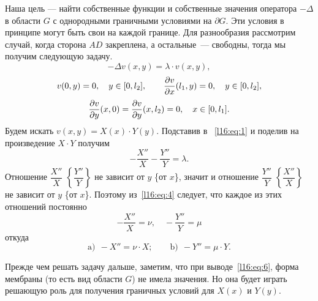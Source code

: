 \noindent Наша цель --- найти собственные функции и собственные значения оператора $-\Delta$ в области $G$ с однородными граничными условиями на $\partial G$. Эти условия в принципе могут быть свои на каждой границе. Для разнообразия рассмотрим случай, когда сторона $AD$ закреплена, а остальные~--- свободны, тогда мы получим следующую задачу.
\begin{equation}\label{l16:eq:1}
	-\Delta v(x,y)=\lambda\cdot v(x,y),
\end{equation}  
\begin{equation}\label{l16:eq:2}
	 v(0,y)=0,\quad y\in[0,l_2],\qquad \frac{\partial v}{\partial x}(l_1,y)=0,\quad y\in[0,l_2],
\end{equation}
\begin{equation}\label{l16:eq:3}
	 \frac{\partial v}{\partial y}(x,0)=\frac{\partial v}{\partial y}(x,l_2)=0,\quad  x\in[0,l_1].
\end{equation}
Будем искать $v(x,y)=X(x)\cdot Y(y)$. Подставив в ~\eqref{l16:eq:1} и поделив на произведение $X\cdot Y$ получим 
\begin{equation}\label{l16:eq:4}
	-\frac{X''}{X}-\frac{Y''}{Y}=\lambda.
\end{equation}
Отношение $\dfrac{X''}{X}$ $\left\{\dfrac{Y''}{Y}\right\}$ не зависит от $y$ \{от $x$\}, значит и отношение $\dfrac{Y''}{Y}$ $\left\{\dfrac{X''}{X}\right\}$ не зависит от $y$ \{от $x$\}. Поэтому из~\eqref{l16:eq:4} следует, что каждое из этих отношений постоянно
\begin{equation}\label{l16:eq:5}
	-\frac{X''}{X}=\nu,\quad-\frac{Y''}{Y}=\mu
\end{equation} 
откуда
\begin{equation}\label{l16:eq:6}
	\text{a)}\ \ -X''=\nu\cdot X;\qquad\text{b)}\ \ -Y''=\mu\cdot Y.
\end{equation}

Прежде чем решать задачу дальше, заметим, что при выводе~\eqref{l16:eq:6},  форма мембраны (то есть вид области $G$) не имела значения. Но она будет играть решающую роль для получения граничных условий для $X(x)$ и $Y(y)$.

